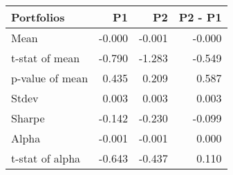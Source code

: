 \begin{tabular}{lrrr}
\toprule
Portfolios & P1 & P2 & P2 - P1 \\
\midrule
Mean & -0.000 & -0.001 & -0.000 \\
t-stat of mean & -0.790 & -1.283 & -0.549 \\
p-value of mean & 0.435 & 0.209 & 0.587 \\
Stdev & 0.003 & 0.003 & 0.003 \\
Sharpe & -0.142 & -0.230 & -0.099 \\
Alpha & -0.001 & -0.001 & 0.000 \\
t-stat of alpha & -0.643 & -0.437 & 0.110 \\
\bottomrule
\end{tabular}
